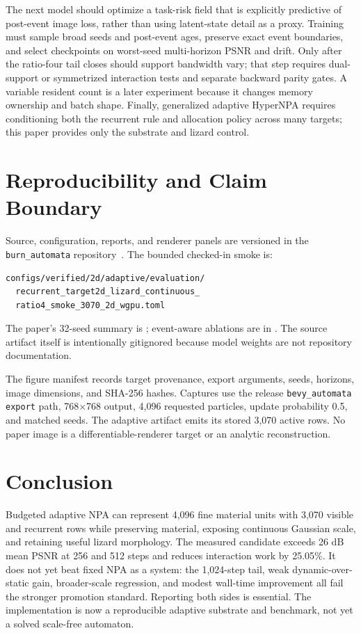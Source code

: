 \documentclass[sigconf,nonacm]{acmart}
\begin{document}
The next model should optimize a task-risk field that is explicitly predictive
of post-event image loss, rather than using latent-state detail as a proxy.
Training must sample broad seeds and post-event ages, preserve exact event
boundaries, and select checkpoints on worst-seed multi-horizon PSNR and drift.
Only after the ratio-four tail closes should support bandwidth vary; that step
requires dual-support or symmetrized interaction tests and separate backward
parity gates. A variable resident count is a later experiment because it
changes memory ownership and batch shape. Finally, generalized adaptive
HyperNPA requires conditioning both the recurrent rule and allocation policy
across many targets; this paper provides only the substrate and lizard control.

\section{Reproducibility and Claim Boundary}

Source, configuration, reports, and renderer panels are versioned in the
\texttt{burn\_automata} repository~\cite{mosure2026burnautomata}. The bounded
checked-in smoke is:
\begin{verbatim}
configs/verified/2d/adaptive/evaluation/
  recurrent_target2d_lizard_continuous_
  ratio4_smoke_3070_2d_wgpu.toml
\end{verbatim}
The paper's 32-seed summary is
;
event-aware ablations are in
.
The source artifact itself is intentionally gitignored because model weights
are not repository documentation.

The figure manifest records target provenance, export arguments, seeds,
horizons, image dimensions, and SHA-256 hashes. Captures use the release
\texttt{bevy\_automata export} path, 768$\times$768 output, 4,096 requested
particles, update probability 0.5, and matched seeds. The adaptive artifact
emits its stored 3,070 active rows. No paper image is a differentiable-renderer
target or an analytic reconstruction.

\section{Conclusion}

Budgeted adaptive NPA can represent 4,096 fine material units with 3,070
visible and recurrent rows while preserving material, exposing continuous
Gaussian scale, and retaining useful lizard morphology. The measured candidate
exceeds 26 dB mean PSNR at 256 and 512 steps and reduces interaction work by
25.05\%. It does not yet beat fixed NPA as a system: the 1,024-step tail,
weak dynamic-over-static gain, broader-scale regression, and modest wall-time
improvement all fail the stronger promotion standard. Reporting both sides is
essential. The implementation is now a reproducible adaptive substrate and
benchmark, not yet a solved scale-free automaton.



\end{document}
